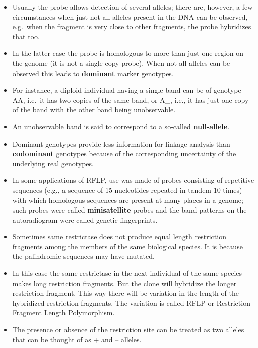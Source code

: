 \documentclass[11pt,dvipsnames,ignorenonframetext,aspectratio=169]{beamer}
\providecommand{\tightlist}{%
  \setlength{\itemsep}{0pt}\setlength{\parskip}{0pt}}
\begin{document}
\begin{frame}{}
\protect\hypertarget{section-24}{}
\begin{itemize}
\tightlist
\item
  Usually the probe allows detection of several alleles; there are,
  however, a few circumstances when just not all alleles present in the
  DNA can be observed, e.g.~when the fragment is very close to other
  fragments, the probe hybridizes that too.
\item
  In the latter case the probe is homologous to more than just one
  region on the genome (it is not a single copy probe). When not all
  alleles can be observed this leads to \textbf{dominant} marker
  genotypes.
\item
  For instance, a diploid individual having a single band can be of
  genotype AA, i.e.~it has two copies of the same band, or A\_, i.e., it
  has just one copy of the band with the other band being unobservable.
\end{itemize}
\end{frame}

\begin{frame}{}
\protect\hypertarget{section-25}{}
\begin{itemize}
\tightlist
\item
  An unobservable band is said to correspond to a so-called
  \textbf{null-allele}.
\item
  Dominant genotypes provide less information for linkage analysis than
  \textbf{codominant} genotypes because of the corresponding uncertainty
  of the underlying real genotypes.
\item
  In some applications of RFLP, use was made of probes consisting of
  repetitive sequences (e.g., a sequence of 15 nucleotides repeated in
  tandem 10 times) with which homologous sequences are present at many
  places in a genome; such probes were called \textbf{minisatellite}
  probes and the band patterns on the autoradiogram were called genetic
  fingerprints.
\end{itemize}
\end{frame}

\begin{frame}{}
\protect\hypertarget{section-26}{}
\begin{itemize}
\tightlist
\item
  Sometimes same restrictase does not produce equal length restriction
  fragments among the members of the same biological species. It is
  because the palindromic sequences may have mutated.
\item
  In this case the same restrictase in the next individual of the same
  species makes long restriction fragments. But the clone will hybridize
  the longer restriction fragment. This way there will be variation in
  the length of the hybridized restriction fragments. The variation is
  called RFLP or Restriction Fragment Length Polymorphism.
\item
  The presence or absence of the restriction site can be treated as two
  alleles that can be thought of as + and -- alleles.
\end{itemize}
\end{frame}
\end{document}
